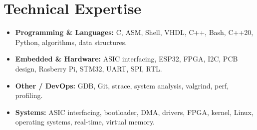 \documentclass[9pt,a4paper]{article}
\begin{document}
\section*{Technical Expertise}
\begin{tcolorbox}[mybox]
\begin{itemize}
\item \textbf{Programming \& Languages:} C, ASM, Shell, VHDL, C++, Bash, C++20, Python, algorithms, data structures.

\item \textbf{Embedded \& Hardware:} ASIC interfacing, ESP32, FPGA, I2C, PCB design, Rasberry Pi, STM32, UART, SPI, RTL.

\item \textbf{Other / DevOps:} GDB, Git, strace, system analysis, valgrind, perf, profiling.

\item \textbf{Systems:} ASIC interfacing, bootloader, DMA, drivers, FPGA, kernel, Linux, operating systems, real-time, virtual memory.
\end{itemize}
\end{tcolorbox}
\end{document}
